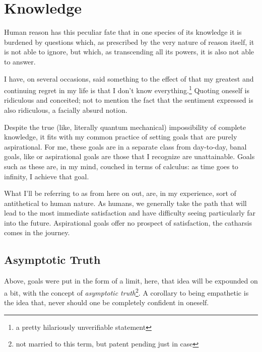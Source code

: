 \documentclass[../butidigress.tex]{subfiles}
\begin{document}
\chapter{Knowledge}\label{chap:knowledge}
\epigraph{Human reason has this peculiar fate that in one species of its knowledge it is burdened by questions which, as prescribed by the very nature of reason itself, it is not able to ignore, but which, as transcending all its powers, it is also not able to answer.}{}
\newpage

I have, on several occasions, said something to the effect of that my greatest and continuing regret in my life is that I don't know everything.\footnote{a pretty hilariously unverifiable statement}
Quoting oneself is ridiculous and conceited; not to mention the fact that the sentiment expressed is also ridiculous, a facially absurd notion.

Despite the true (like, literally quantum mechanical) impossibility of complete knowledge, it fits with my common practice of setting goals that are purely aspirational.
For me, these goals are in a separate class from day-to-day, banal goals, like  or  aspirational goals are those that I recognize are unattainable.
Goals such as these are, in my mind, couched in terms of calculus: as time goes to infinity, I achieve that goal.

What I'll be referring to as  from here on out, are, in my experience, sort of antithetical to human nature.
As humans, we generally take the path that will lead to the most immediate satisfaction and have difficulty seeing particularly far into the future.
Aspirational goals offer no prospect of satisfaction, the catharsis comes in the journey.

\section{Asymptotic Truth}\label{sec:asymptotic}
Above, goals were put in the form of a limit, here, that idea will be expounded on a bit, with the concept of \emph{asymptotic truth}\footnote{not married to this term, but patent pending just in case}.
A corollary to being empathetic is the idea that, never should one be completely confident in oneself.
\end{document}
